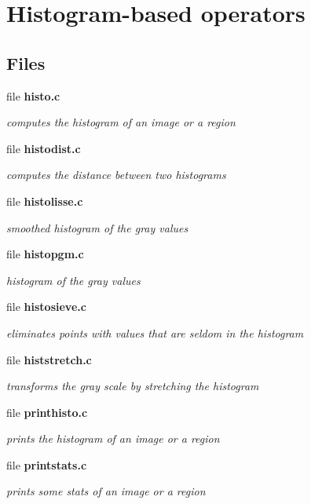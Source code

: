 \section{Histogram-based operators}
\label{group__histo}
\subsection*{Files}
\begin{CompactItemize}
\item 
file {\bf histo.c}
\begin{CompactList}\small\item\em computes the histogram of an image or a region \item\end{CompactList}

\item 
file {\bf histodist.c}
\begin{CompactList}\small\item\em computes the distance between two histograms \item\end{CompactList}

\item 
file {\bf histolisse.c}
\begin{CompactList}\small\item\em smoothed histogram of the gray values \item\end{CompactList}

\item 
file {\bf histopgm.c}
\begin{CompactList}\small\item\em histogram of the gray values \item\end{CompactList}

\item 
file {\bf histosieve.c}
\begin{CompactList}\small\item\em eliminates points with values that are seldom in the histogram \item\end{CompactList}

\item 
file {\bf histstretch.c}
\begin{CompactList}\small\item\em transforms the gray scale by stretching the histogram \item\end{CompactList}

\item 
file {\bf printhisto.c}
\begin{CompactList}\small\item\em prints the histogram of an image or a region \item\end{CompactList}

\item 
file {\bf printstats.c}
\begin{CompactList}\small\item\em prints some stats of an image or a region \item\end{CompactList}

\end{CompactItemize}
